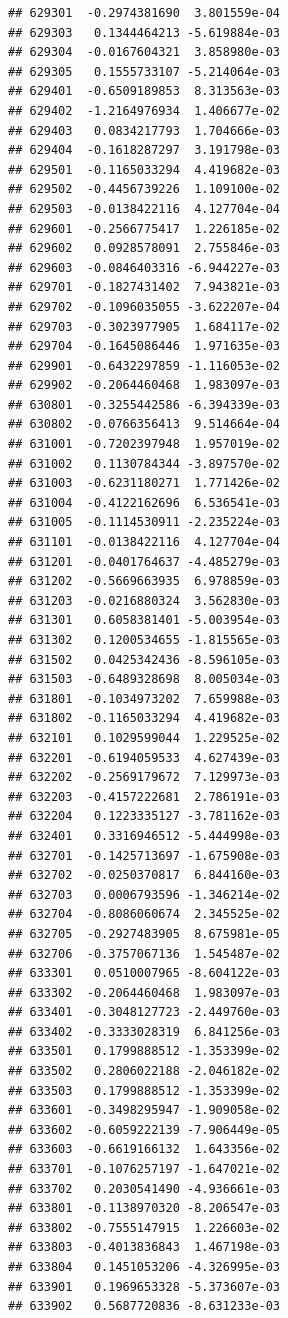\begin{frame}[fragile]
\begin{verbatim}
## 629301  -0.2974381690  3.801559e-04
## 629303   0.1344464213 -5.619884e-03
## 629304  -0.0167604321  3.858980e-03
## 629305   0.1555733107 -5.214064e-03
## 629401  -0.6509189853  8.313563e-03
## 629402  -1.2164976934  1.406677e-02
## 629403   0.0834217793  1.704666e-03
## 629404  -0.1618287297  3.191798e-03
## 629501  -0.1165033294  4.419682e-03
## 629502  -0.4456739226  1.109100e-02
## 629503  -0.0138422116  4.127704e-04
## 629601  -0.2566775417  1.226185e-02
## 629602   0.0928578091  2.755846e-03
## 629603  -0.0846403316 -6.944227e-03
## 629701  -0.1827431402  7.943821e-03
## 629702  -0.1096035055 -3.622207e-04
## 629703  -0.3023977905  1.684117e-02
## 629704  -0.1645086446  1.971635e-03
## 629901  -0.6432297859 -1.116053e-02
## 629902  -0.2064460468  1.983097e-03
## 630801  -0.3255442586 -6.394339e-03
## 630802  -0.0766356413  9.514664e-04
## 631001  -0.7202397948  1.957019e-02
## 631002   0.1130784344 -3.897570e-02
## 631003  -0.6231180271  1.771426e-02
## 631004  -0.4122162696  6.536541e-03
## 631005  -0.1114530911 -2.235224e-03
## 631101  -0.0138422116  4.127704e-04
## 631201  -0.0401764637 -4.485279e-03
## 631202  -0.5669663935  6.978859e-03
## 631203  -0.0216880324  3.562830e-03
## 631301   0.6058381401 -5.003954e-03
## 631302   0.1200534655 -1.815565e-03
## 631502   0.0425342436 -8.596105e-03
## 631503  -0.6489328698  8.005034e-03
## 631801  -0.1034973202  7.659988e-03
## 631802  -0.1165033294  4.419682e-03
## 632101   0.1029599044  1.229525e-02
## 632201  -0.6194059533  4.627439e-03
## 632202  -0.2569179672  7.129973e-03
## 632203  -0.4157222681  2.786191e-03
## 632204   0.1223335127 -3.781162e-03
## 632401   0.3316946512 -5.444998e-03
## 632701  -0.1425713697 -1.675908e-03
## 632702  -0.0250370817  6.844160e-03
## 632703   0.0006793596 -1.346214e-02
## 632704  -0.8086060674  2.345525e-02
## 632705  -0.2927483905  8.675981e-05
## 632706  -0.3757067136  1.545487e-02
## 633301   0.0510007965 -8.604122e-03
## 633302  -0.2064460468  1.983097e-03
## 633401  -0.3048127723 -2.449760e-03
## 633402  -0.3333028319  6.841256e-03
## 633501   0.1799888512 -1.353399e-02
## 633502   0.2806022188 -2.046182e-02
## 633503   0.1799888512 -1.353399e-02
## 633601  -0.3498295947 -1.909058e-02
## 633602  -0.6059222139 -7.906449e-05
## 633603  -0.6619166132  1.643356e-02
## 633701  -0.1076257197 -1.647021e-02
## 633702   0.2030541490 -4.936661e-03
## 633801  -0.1138970320 -8.206547e-03
## 633802  -0.7555147915  1.226603e-02
## 633803  -0.4013836843  1.467198e-03
## 633804   0.1451053206 -4.326995e-03
## 633901   0.1969653328 -5.373607e-03
## 633902   0.5687720836 -8.631233e-03

\end{verbatim}
\end{frame}
